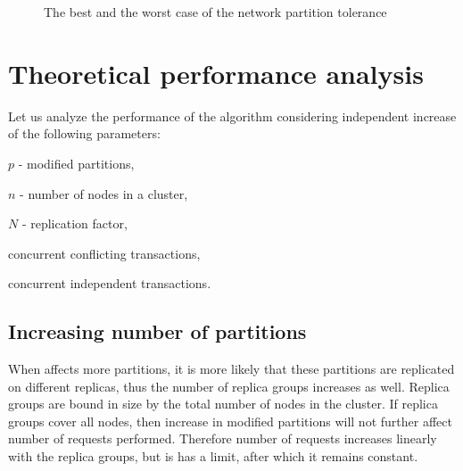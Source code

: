 \begin{figure}[hbt]
  \setlength{\unitlength}{1.3cm}  
  \caption{The best and the worst case of the network partition tolerance}
  \label{fig:tests:networkPartitionTolerance}
\end{figure}

\section{Theoretical performance analysis}
Let us analyze the performance of the \mpt algorithm considering independent increase of the following parameters: 
\begin{enumerate*}
\item $p$ - modified partitions,
\item $n$ - number of nodes in a cluster,
\item $N$ - replication factor,
\item concurrent conflicting transactions,
\item concurrent independent transactions.
\end{enumerate*}

\subsection{Increasing number of partitions}
\label{sec:tests:perf:partitions}
When \mpt affects more partitions, it is more likely that these partitions are replicated on different replicas, thus the number of replica groups increases as well. Replica groups are bound in size by the total number of nodes in the cluster. If replica groups cover all nodes, then increase in modified partitions will not further affect number of requests performed. Therefore number of requests increases linearly with the replica groups, but is has a limit, after which it remains constant.


